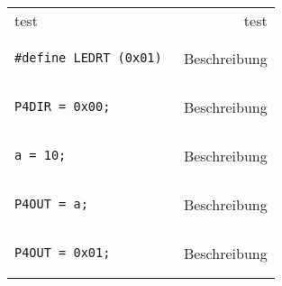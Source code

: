 \documentclass[11pt,a4paper,onecolumn]{report}
\begin{document}
\begin{tabular}{lr}


test & test  \\

\begin{lstlisting}
#define LEDRT (0x01) 
\end{lstlisting} &
Beschreibung \\

\begin{lstlisting}
P4DIR = 0x00;
\end{lstlisting} &
Beschreibung \\

\begin{lstlisting} 
a = 10;
\end{lstlisting}&
Beschreibung \\

\begin{lstlisting} 
P4OUT = a;
\end{lstlisting}&
Beschreibung \\

\begin{lstlisting}
P4OUT = 0x01;
\end{lstlisting}&
Beschreibung \\



\end{tabular}
\end{document}
